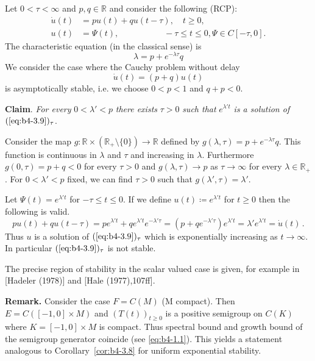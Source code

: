 	Let $0 < \tau < \infty$ and $p,q \in \mathbb{R}$ and consider the following (RCP):
	\begin{equation}\label{eq:b4-3.9}	\begin{aligned}
		\dot{u}(t) &= pu(t) + qu(t-\tau) , \quad t \geq 0 ,\\
		u(t) &= \Psi(t) , \quad\quad\quad\quad\quad\; -\tau \leq t \leq 0 , \Psi \in C[-\tau,0] .
	\end{aligned}
	\end{equation}
%
%
%
%
%
\newpage
%
The characteristic equation (in the classical sense) is 
\begin{equation}\label{eq:b4-3.10}
\lambda = p + e^{-\lambda\tau}q
\end{equation}
We consider the case where the Cauchy problem without delay
\[
\dot{u}(t) = (p + q)u(t)
\]
is asymptotically stable, i.e. we choose $0 < p < 1$ and $q + p < 0$.

\medskip\noindent
\textbf{Claim}.
	\textit{For every} $0 < \lambda' < p$ \textit{there exists} $\tau > 0$ \textit{such that} $e^{\lambda't}$ \textit{is a solution of} $(\ref{eq:b4-3.9})_{\tau}$.

\medskip 
Consider the map $g \colon \mathbb{R}\times(\mathbb{R}_{+}\setminus\{0\}) \to \mathbb{R}$ defined by $g(\lambda,\tau) = p + e^{-\lambda\tau}q$.
This function is continuous in $\lambda$ and $\tau$ and increasing in $\lambda$.
Furthermore $g(0,\tau) = p + q < 0$ for every $\tau > 0$ and $g(\lambda,\tau) \to p$ as $\tau \to \infty$ for every $\lambda \in \mathbb{R}_{+}$.
For $0 < \lambda' < p$ fixed, we can find $\tau > 0$ such that $g(\lambda',\tau) = \lambda'$.

Let $\Psi(t) = e^{\lambda't}$ for $-\tau \leq t \leq 0$. 
If we define $u(t) \coloneq e^{\lambda't}$ for $t \geq 0$ then the following is valid.
\[
pu(t) + qu(t-\tau) = pe^{\lambda't} + qe^{\lambda't}e^{-\lambda'\tau} = (p+qe^{-\lambda'\tau})e^{\lambda't} = \lambda'e^{\lambda't} = \dot{u}(t)\,.
\]
Thus $u$ is a solution of $(\ref{eq:b4-3.9})_{\tau}$ which is exponentially increasing as $t \to \infty$. 
In particular $(\ref{eq:b4-3.9})_{\tau}$ is not stable.

The precise region of stability in the scalar valued case is given, for example in [Hadeler (1978)] and [Hale (1977),107ff].

\medskip\noindent
\textbf{Remark.}
	Consider the case $F = C(M)$ (M compact).
	Then $E = C([-1,0] \times M)$ and $(T(t))_{t\geq0}$ is a positive semigroup on $C(K)$ where $K = [-1,0] \times M$ is compact. 
	Thus spectral bound and growth bound of the semigroup generator coincide (see \ref{eq:b4-1.1}). 
	This yields a statement analogous to Corollary~\ref{cor:b4-3.8} for uniform exponential stability.

